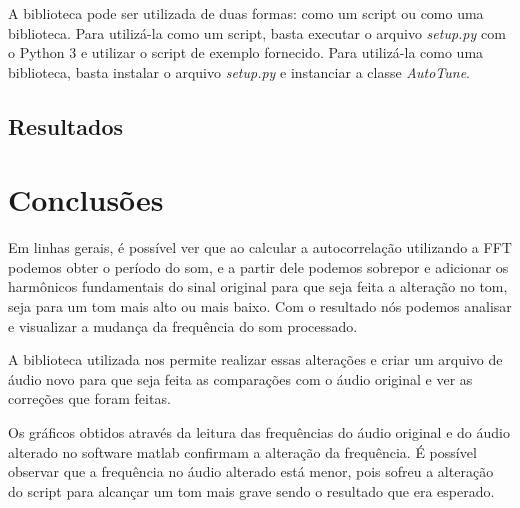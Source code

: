 \documentclass{sbrt}
\begin{document}
A biblioteca pode ser utilizada de duas formas: como um script ou como uma biblioteca. Para utilizá-la como um script,
basta executar o arquivo \textit{setup.py} com o Python 3 e utilizar o script de exemplo fornecido. Para utilizá-la como
uma biblioteca, basta instalar o arquivo \textit{setup.py} e instanciar a classe \textit{AutoTune}.

\subsection{Resultados}


\section{Conclusões}

Em linhas gerais, é possível ver que ao calcular a autocorrelação utilizando a FFT podemos obter o período do som, e a partir dele podemos sobrepor e adicionar os harmônicos fundamentais do sinal original para que seja feita a alteração no tom, seja para um tom mais alto ou mais baixo. Com o resultado nós podemos analisar e visualizar a mudança da frequência do som processado.

A biblioteca utilizada nos permite realizar essas alterações e criar um arquivo de áudio novo para que seja feita as comparações com o áudio original e ver as correções que foram feitas. 

Os gráficos obtidos através da leitura das frequências do áudio original e do áudio alterado no software matlab confirmam a alteração da frequência. É possível observar que a frequência no áudio alterado está menor, pois sofreu a alteração do script para alcançar um tom mais grave sendo o resultado que era esperado. 





\end{document}
